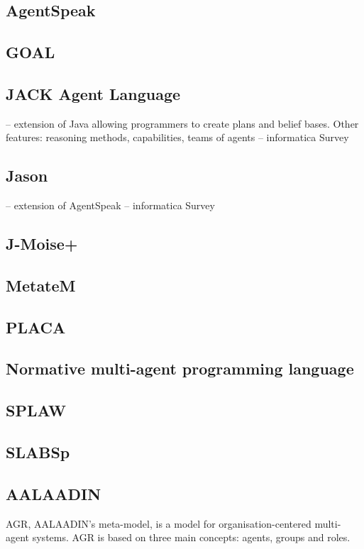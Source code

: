 \documentclass{article}
\begin{document}
\subsection{AgentSpeak}
\subsection{GOAL}
\subsection{JACK Agent Language}

-- extension of Java allowing programmers to create plans and belief bases. 
Other features: reasoning methods, capabilities, teams of agents 
-- informatica Survey

\subsection{Jason}
-- extension of AgentSpeak -- informatica Survey
\subsection{J-Moise+}
\subsection{MetateM}
\subsection{PLACA}
\subsection{Normative multi-agent programming language}
\subsection{SPLAW}
\subsection{SLABSp}

\subsection{AALAADIN} 
\label{sec:aalaadin}

AGR, AALAADIN's meta-model, is a model for organisation-centered
multi-agent systems. AGR is based on three main concepts: agents,
groups and roles.
\end{document}
